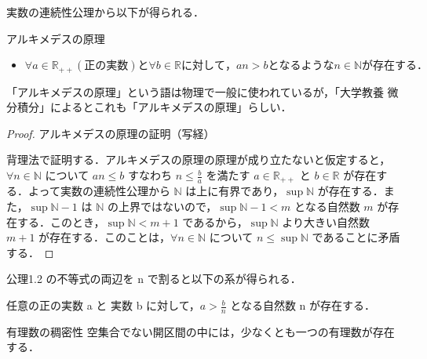 \documentclass[a4paper]{ltjsarticle}
\begin{document}
実数の連続性公理から以下が得られる．
\begin{corollary}{アルキメデスの原理}{}
\begin{itemize}
\item $ \forall a \in \mathbb{R} _ {++} (正の実数) と \forall b \in \mathbb{R} に対して，an > b となるような n \in \mathbb{N} が存在する．$

\end{itemize}
\end{corollary}
「アルキメデスの原理」という語は物理で一般に使われているが，「大学教養 微分積分」によるとこれも「アルキメデスの原理」らしい．

\begin{proof}{アルキメデスの原理の証明（写経）}{}

背理法で証明する．アルキメデスの原理の原理が成り立たないと仮定すると，$\forall n \in \mathbb{N}$ について $an \leq b$ すなわち $n \leq \frac{b}{a}$ を満たす $a \in \mathbb{R}_{++}$ と $b \in \mathbb{R}$ が存在する．よって実数の連続性公理から $\mathbb{N}$ は上に有界であり，$\sup \mathbb{N}$ が存在する．また，$\sup \mathbb{N} - 1$ は $\mathbb{N}$ の上界ではないので，$\sup \mathbb{N} - 1 < m$ となる自然数 $m$ が存在する．このとき，$\sup \mathbb{N} < m + 1$ であるから，$\sup \mathbb{N}$ より大きい自然数 $m + 1$ が存在する．このことは，$\forall n \in \mathbb{N}$ について $n \leq \sup \mathbb{N}$ であることに矛盾する．

\end{proof}


公理1.2 の不等式の両辺を n で割ると以下の系が得られる．

\begin{corollary}{}{}
任意の正の実数 a と 実数 b に対して，$a > \frac{b}{n}$ となる自然数 n が存在する．
\end{corollary}

\begin{theorem}{有理数の稠密性}{}
空集合でない開区間の中には，少なくとも一つの有理数が存在する．
\end{theorem}
\end{document}
